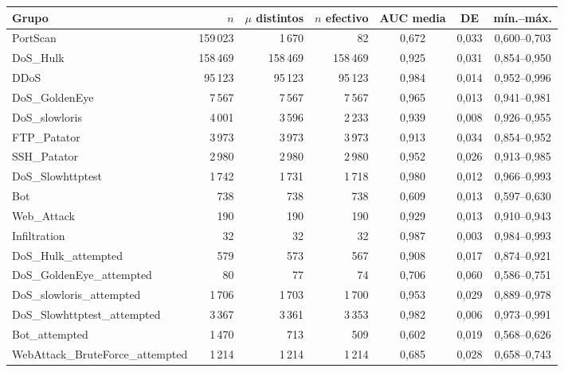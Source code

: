 \begin{tabular}{@{}lrrrccc@{}}
\toprule
Grupo & $n$ & $\mu$ distintos & $n$ efectivo & AUC media & DE & mín.--máx. \\
\midrule
PortScan & 159\,023 & 1\,670 & 82 & 0{,}672 & 0{,}033 & 0{,}600--0{,}703 \\
DoS\_Hulk & 158\,469 & 158\,469 & 158\,469 & 0{,}925 & 0{,}031 & 0{,}854--0{,}950 \\
DDoS & 95\,123 & 95\,123 & 95\,123 & 0{,}984 & 0{,}014 & 0{,}952--0{,}996 \\
DoS\_GoldenEye & 7\,567 & 7\,567 & 7\,567 & 0{,}965 & 0{,}013 & 0{,}941--0{,}981 \\
DoS\_slowloris & 4\,001 & 3\,596 & 2\,233 & 0{,}939 & 0{,}008 & 0{,}926--0{,}955 \\
FTP\_Patator & 3\,973 & 3\,973 & 3\,973 & 0{,}913 & 0{,}034 & 0{,}854--0{,}952 \\
SSH\_Patator & 2\,980 & 2\,980 & 2\,980 & 0{,}952 & 0{,}026 & 0{,}913--0{,}985 \\
DoS\_Slowhttptest & 1\,742 & 1\,731 & 1\,718 & 0{,}980 & 0{,}012 & 0{,}966--0{,}993 \\
Bot & 738 & 738 & 738 & 0{,}609 & 0{,}013 & 0{,}597--0{,}630 \\
Web\_Attack & 190 & 190 & 190 & 0{,}929 & 0{,}013 & 0{,}910--0{,}943 \\
Infiltration & 32 & 32 & 32 & 0{,}987 & 0{,}003 & 0{,}984--0{,}993 \\
\midrule
DoS\_Hulk\_attempted & 579 & 573 & 567 & 0{,}908 & 0{,}017 & 0{,}874--0{,}921 \\
DoS\_GoldenEye\_attempted & 80 & 77 & 74 & 0{,}706 & 0{,}060 & 0{,}586--0{,}751 \\
DoS\_slowloris\_attempted & 1\,706 & 1\,703 & 1\,700 & 0{,}953 & 0{,}029 & 0{,}889--0{,}978 \\
DoS\_Slowhttptest\_attempted & 3\,367 & 3\,361 & 3\,353 & 0{,}982 & 0{,}006 & 0{,}973--0{,}991 \\
Bot\_attempted & 1\,470 & 713 & 509 & 0{,}602 & 0{,}019 & 0{,}568--0{,}626 \\
WebAttack\_BruteForce\_attempted & 1\,214 & 1\,214 & 1\,214 & 0{,}685 & 0{,}028 & 0{,}658--0{,}743 \\
\bottomrule
\end{tabular}
